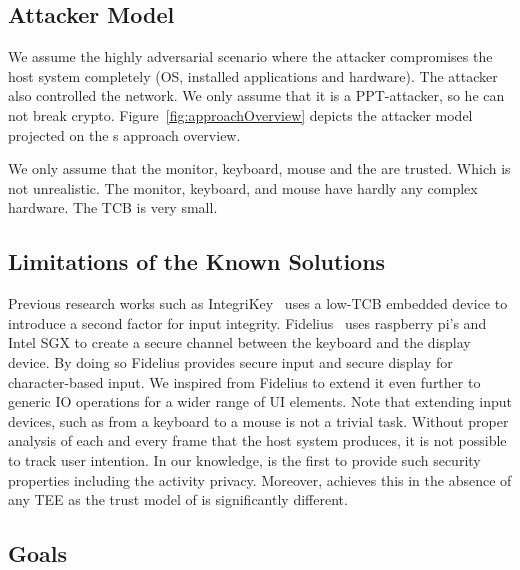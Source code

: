 \subsection{Attacker Model}

We assume the highly adversarial scenario where the attacker compromises the host system completely (OS, installed applications and hardware). The attacker also controlled the network. We only assume that it is a PPT-attacker, so he can not break crypto. Figure~\ref{fig:approachOverview} depicts the attacker model projected on the \name{}s approach overview.

We only assume that the monitor, keyboard, mouse and the \device are trusted. Which is not unrealistic. The monitor, keyboard, and mouse have hardly any complex hardware. The TCB is very small.

\iffalse
\myparagraph{Advantages}

\begin{enumerate}
  \item The \device does not need to know the formatting/template of the page. As the \device only looks to the current mouse position, the structure of the page is somewhat irrelevant (?).
\end{enumerate}
\fi

\subsection{Limitations of the Known Solutions}

Previous research works such as IntegriKey~\cite{IntegriKey} uses a low-TCB embedded device to introduce a second factor for input integrity. Fidelius~\cite{Fidelius} uses raspberry pi's and Intel SGX to create a secure channel between the keyboard and the display device. By doing so Fidelius provides secure input and secure display for character-based input. We inspired from Fidelius to extend it even further to generic IO operations for a wider range of UI elements. Note that extending input devices, such as from a keyboard to a mouse is not a trivial task. Without proper analysis of each and every frame that the host system produces, it is not possible to track user intention. In our knowledge, \name is the first to provide such security properties including the activity privacy.
Moreover, \name achieves this in the absence of any TEE as the trust model of \name is significantly different. 


\subsection{Goals}

